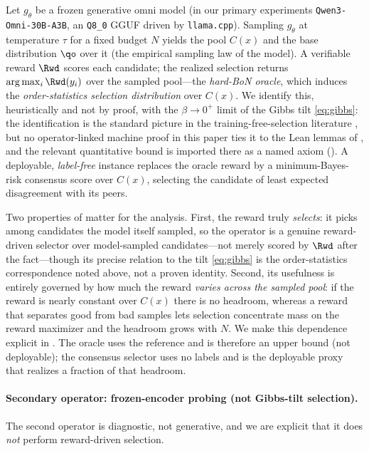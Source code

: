 \begin{definition}
\label{def:operator}
Let $g_\theta$ be a frozen generative omni model (in our primary experiments \texttt{Qwen3-Omni-30B-A3B}, an \texttt{Q8\_0} GGUF driven by \texttt{llama.cpp}). Sampling $g_\theta$ at temperature $\tau$ for a fixed budget $N$ yields the pool $C(x)$ and the base distribution $\qo$ over it (the empirical sampling law of the model). A verifiable reward $\Rwd$ scores each candidate; the realized selection returns $\arg\max_i \Rwd(y_i)$ over the sampled pool---the \emph{hard-BoN oracle}, which induces the \emph{order-statistics selection distribution} over $C(x)$. We identify this, heuristically and not by proof, with the $\beta\to 0^+$ limit of the Gibbs tilt \eqref{eq:gibbs}: the identification is the standard picture in the training-free-selection literature \citep{beirami2024bon}, but no operator-linked machine proof in this paper ties it to the Lean lemmas of , and the relevant quantitative bound is imported there as a named axiom (). A deployable, \emph{label-free} instance replaces the oracle reward by a minimum-Bayes-risk consensus score over $C(x)$, selecting the candidate of least expected disagreement with its peers.
\end{definition}

Two properties of  matter for the analysis. First, the reward truly \emph{selects}: it picks among candidates the model itself sampled, so the operator is a genuine reward-driven selector over model-sampled candidates---not merely scored by $\Rwd$ after the fact---though its precise relation to the tilt \eqref{eq:gibbs} is the order-statistics correspondence noted above, not a proven identity. Second, its usefulness is entirely governed by how much the reward \emph{varies across the sampled pool}: if the reward is nearly constant over $C(x)$ there is no headroom, whereas a reward that separates good from bad samples lets selection concentrate mass on the reward maximizer and the headroom grows with $N$. We make this dependence explicit in . The oracle uses the reference and is therefore an upper bound (not deployable); the consensus selector uses no labels and is the deployable proxy that realizes a fraction of that headroom.

\paragraph{Secondary operator: frozen-encoder probing (not Gibbs-tilt selection).}
The second operator is diagnostic, not generative, and we are explicit that it does \emph{not} perform reward-driven selection.

